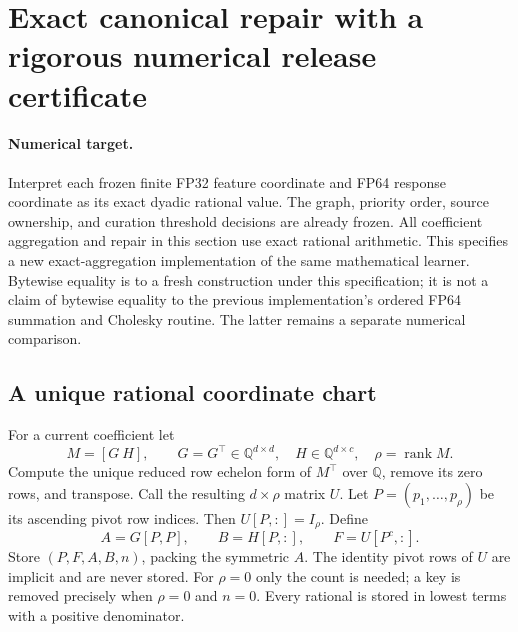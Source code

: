 \section{Exact canonical repair with a rigorous numerical release certificate}
\label{sec:exact-canonical-repair}

\paragraph{Numerical target.}
Interpret each frozen finite FP32 feature coordinate and FP64 response
coordinate as its exact dyadic rational value. The graph, priority order,
source ownership, and curation threshold decisions are already frozen.
All coefficient aggregation and repair in this section use exact rational
arithmetic. This specifies a new exact-aggregation implementation of the
same mathematical learner. Bytewise equality is to a fresh construction
under this specification; it is not a claim of bytewise equality to the
previous implementation's ordered FP64 summation and Cholesky routine.
The latter remains a separate numerical comparison.

\subsection{A unique rational coordinate chart}
For a current coefficient let
\[
 M=[G\ H],\qquad G=G^\top\in\mathbb Q^{d\times d},\quad
 H\in\mathbb Q^{d\times c},\quad \rho=\operatorname{rank}M.
\]
Compute the unique reduced row echelon form of $M^\top$ over
$\mathbb Q$, remove its zero rows, and transpose. Call the resulting
$d\times\rho$ matrix $U$. Let $P=(p_1,\ldots,p_\rho)$ be its ascending
pivot row indices. Then $U[P,:]=I_\rho$. Define
\[
 A=G[P,P],\qquad B=H[P,:],\qquad
 F=U[P^c,:].
\]
Store $(P,F,A,B,n)$, packing the symmetric $A$. The identity pivot rows
of $U$ are implicit and are never stored. For $\rho=0$ only the count is
needed; a key is removed precisely when $\rho=0$ and $n=0$.
Every rational is stored in lowest terms with a positive denominator.

